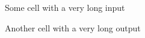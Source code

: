 \documentclass{article}
\begin{document}
Some cell with a very long input


Another cell with a very long output

\end{document}
